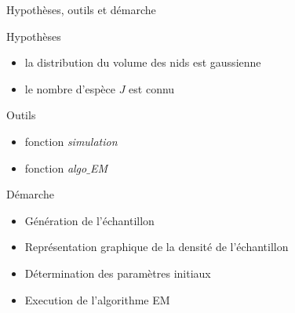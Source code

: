 \documentclass[11pt]{beamer}
\begin{document}
	\begin{frame}{Hypothèses, outils et démarche}
		\begin{block}{\scriptsize Hypothèses}
			\begin{itemize}
				\scriptsize 
				\item la distribution du volume des nids est gaussienne
				\item le nombre d'espèce $J$ est connu
			\end{itemize}
		\end{block}

		\begin{block}{\scriptsize Outils}
			\begin{itemize}
				\scriptsize 
				\item fonction \textit{simulation}
				\item fonction \textit{algo$\_$EM}
			\end{itemize}
		\end{block}

		\begin{block}{\scriptsize  Démarche}
			\begin{itemize}
				\scriptsize 
				\item Génération de l'échantillon
				\item Représentation graphique de la densité de l'échantillon
				\item Détermination des paramètres initiaux
				\item Execution de l'algorithme EM
			\end{itemize}
		\end{block}

	\end{frame}
\end{document}
